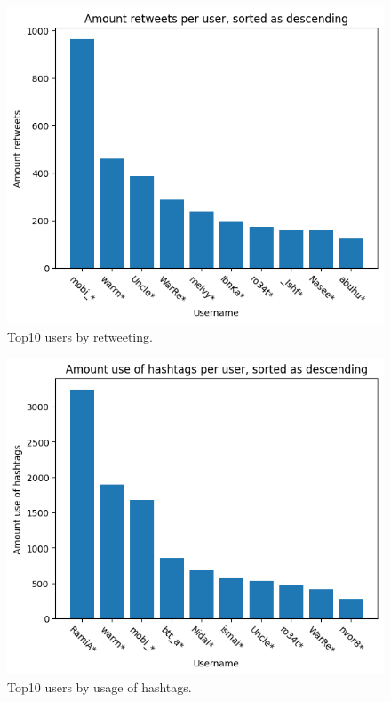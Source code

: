 \documentclass[conference]{IEEEtran}
\begin{document}
\begin{figure}
\includegraphics[scale=0.6]{figures/amount_retweets_user}
\caption{Top10 users by retweeting.}
\label{fig:amount-retweets-user}
\end{figure}

\begin{figure}
\includegraphics[scale=0.6]{figures/amount_hashtags_user}
\caption{Top10 users by usage of hashtags.}
\label{fig:amount-hashtags-user}
\end{figure}
\end{document}
